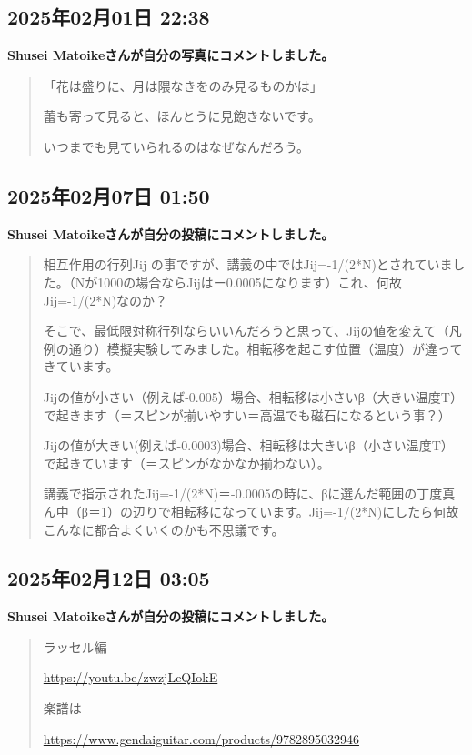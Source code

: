 \subsection*{2025年02月01日 22:38}

\textbf{Shusei Matoikeさんが自分の写真にコメントしました。}

\begin{quote}
「花は盛りに、月は隈なきをのみ見るものかは」

蕾も寄って見ると、ほんとうに見飽きないです。

いつまでも見ていられるのはなぜなんだろう。
\end{quote}

\subsection*{2025年02月07日 01:50}

\textbf{Shusei Matoikeさんが自分の投稿にコメントしました。}

\begin{quote}
相互作用の行列Jij の事ですが、講義の中ではJij=-1/(2*N)とされていました。（Nが1000の場合ならJijはー0.0005になります）これ、何故Jij=-1/(2*N)なのか？

そこで、最低限対称行列ならいいんだろうと思って、Jijの値を変えて（凡例の通り）模擬実験してみました。相転移を起こす位置（温度）が違ってきています。

Jijの値が小さい（例えば-0.005）場合、相転移は小さいβ（大きい温度T）で起きます（＝スピンが揃いやすい＝高温でも磁石になるという事？）

Jijの値が大きい(例えば-0.0003)場合、相転移は大きいβ（小さい温度T）で起きています（＝スピンがなかなか揃わない）。

講義で指示されたJij=-1/(2*N)＝-0.0005の時に、βに選んだ範囲の丁度真ん中（β＝1）の辺りで相転移になっています。Jij=-1/(2*N)にしたら何故こんなに都合よくいくのかも不思議です。
\end{quote}

\subsection*{2025年02月12日 03:05}

\textbf{Shusei Matoikeさんが自分の投稿にコメントしました。}

\begin{quote}
ラッセル編

\url{https://youtu.be/zwzjLeQIokE}

楽譜は

\url{https://www.gendaiguitar.com/products/9782895032946}
\end{quote}

